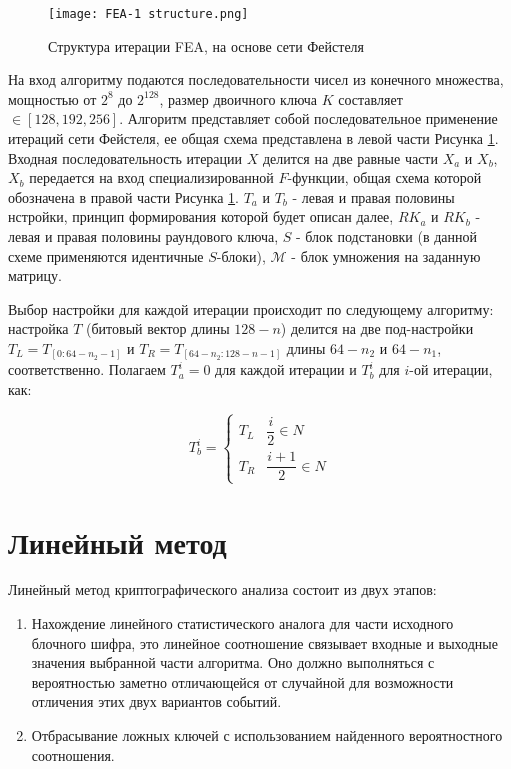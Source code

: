 \documentclass[utf8x, 14pt]{G7-32} %
\begin{document}
\begin{figure}[h!]
	\texttt{[image: FEA-1 structure.png]}
	\caption{Структура итерации FEA, на основе сети Фейстеля}
	\label{fig:fea_structure}
\end{figure}

На вход алгоритму подаются последовательности чисел из конечного множества, мощностью от $2^8$ до $2^{128}$, размер двоичного ключа $K$ составляет $\in [ 128, 192, 256 ]$. Алгоритм представляет собой последовательное применение итераций сети Фейстеля, ее общая схема представлена в левой части Рисунка \ref{fig:fea_structure}. Входная последовательность итерации $X$ делится на две равные части $X_a$ и $ X_b$, $X_b$ передается на вход специализированной $F$-функции, общая схема которой обозначена в правой части Рисунка \ref{fig:fea_structure}. $T_a$ и $T_b$ - левая и правая половины нстройки, принцип формирования которой будет описан далее, $RK_a$ и $RK_b$ - левая и правая половины раундового ключа, $S$ - блок подстановки (в данной схеме применяются идентичные $S$-блоки), $\mathcal{M}$ - блок умножения на заданную матрицу.


Выбор настройки для каждой итерации происходит по следующему алгоритму: настройка $T$ (битовый вектор длины $128-n$) делится на две под-настройки $T_L = T_{ [ 0:64-n_2-1 ] }$ и $T_R=T_{ [ 64-n_2:128-n-1 ] }$ длины $64-n_2$ и $64-n_1$, соответственно. Полагаем $T_a^i=0$ для каждой итерации и $T_b^i$ для $i$-ой итерации, как:

$$ T_b^i =
\begin{cases}
T_L & \dfrac{i}{2} \in N \\
T_R & \dfrac{i+1}{2} \in N
\end{cases} $$

\section{Линейный метод}

Линейный метод криптографического анализа состоит из двух этапов: 
\begin{enumerate}
    \item Нахождение линейного статистического аналога для части исходного блочного шифра, это линейное соотношение связывает входные и выходные значения выбранной части алгоритма. Оно должно выполняться с вероятностью заметно отличающейся от случайной для возможности отличения этих двух вариантов событий.
    \item Отбрасывание ложных ключей с использованием найденного вероятностного соотношения.
\end{enumerate}
\end{document}
